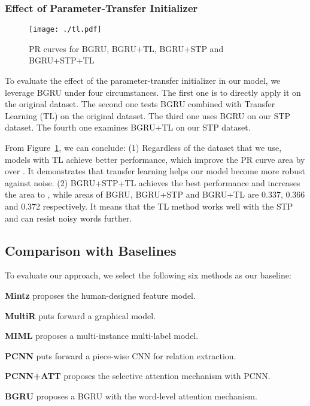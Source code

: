 \documentclass[11pt,a4paper]{article}
\begin{document}
  \subsubsection*{Effect of Parameter-Transfer Initializer}

  \begin{figure}[htbp]
    \centering
    \texttt{[image: ./tl.pdf]}
    \caption{PR curves for BGRU, BGRU+TL, BGRU+STP and BGRU+STP+TL}
    \label{fig:tl}
  \end{figure}

  To evaluate the effect of the parameter-transfer initializer in our model, we leverage BGRU under four circumstances. The first one is to directly apply it on the original dataset. The second one tests BGRU combined with Transfer Learning (TL) on the original dataset. The third one uses BGRU on our STP dataset. The fourth one examines BGRU+TL on our STP dataset.

  From Figure~\ref{fig:tl}, we can conclude: (1) Regardless of the dataset that we use, models with TL achieve better performance, which improve the PR curve area by over . It demonstrates that transfer learning helps our model become more robust against noise. (2) BGRU+STP+TL achieves the best performance and increases the area to , while areas of BGRU, BGRU+STP and BGRU+TL are 0.337, 0.366 and 0.372 respectively. It means that the TL method works well with the STP and can resist noisy words further. 
  
  \subsection{Comparison with Baselines}
  To evaluate our approach, we select the following six methods as our baseline:
  
  \textbf{Mintz} \citep{mintz2009distant} proposes the human-designed feature model.
  
  \textbf{MultiR} \citep{hoffmann2011knowledge} puts forward a graphical model.

  \textbf{MIML} \citep{surdeanu2012multi} proposes a multi-instance multi-label model.

  \textbf{PCNN} \citep{zeng2015distant} puts forward a piece-wise CNN for relation extraction.

  \textbf{PCNN+ATT} \citep{lin2016neural} proposes the selective attention mechanism with PCNN.

  \textbf{BGRU} \citep{zhou2016attention} proposes a BGRU with the word-level attention mechanism.
\end{document}
